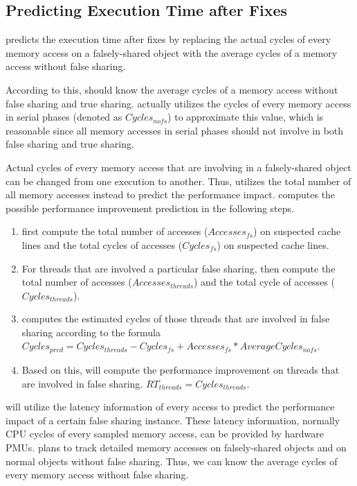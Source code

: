 \subsection{Predicting Execution Time after Fixes}
\label{sec:predicttime}

\cheetah{} predicts the execution time after fixes by replacing the actual cycles of every memory access on a falsely-shared object with the average cycles of a memory access without false sharing. 

According to this, \cheetah{} should know the average cycles of a memory access without false sharing and true sharing. \Cheetah{} actually utilizes the cycles of every memory access in serial phases (denoted as $Cycles_{nofs}$) to approximate this value, which is reasonable since all memory accesses in serial phases should not involve in both false sharing and true sharing. 

Actual cycles of every memory access that are involving in a falsely-shared object can be changed from one execution to another. Thus, \cheetah{} utilizes the total number of all memory accesses instead to predict the performance impact. \Cheetah{} computes the possible performance improvement prediction in the following steps.
 
\begin{enumerate}
\item \cheetah{} first compute the total number of accesses ($Accesses_{fs}$) on suspected cache lines and the total cycles of accesses ($Cycles_{fs}$) on suspected cache lines.

\item For threads that are involved a particular false sharing, \cheetah{} then compute the total number of accesses ($Accesses_{threads}$) and the total cycle of accesses ($Cycles_{threads}$). 

\item \Cheetah{} computes the estimated cycles of those threads that are involved in false sharing according to the formula $Cycles_{pred} = Cycles_{threads} - Cycles_{fs} + Accesses_{fs} * AverageCycles_{nofs}$. 

\item  Based on this, \cheetah{} will compute the performance improvement on threads that are involved in false sharing.
$RT_{threads} = Cycles_{threads}  $. 

\end{enumerate}



\cheetah{} will utilize the latency information of every access to predict the performance impact of a certain false sharing instance. These latency information, normally CPU cycles of every sampled memory access, can be provided by hardware PMUs. \Cheetah{} plans to track detailed memory accesses on falsely-shared objects and on normal objects without false sharing. Thus, we can know the average cycles of every memory access without false sharing. 

